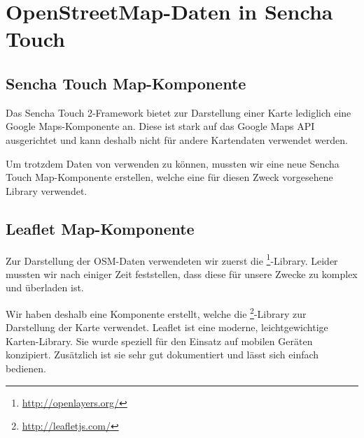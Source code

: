 \chapter{OpenStreetMap-Daten in Sencha Touch}
\label{leaflet-sencha-komponente}

\section{Sencha Touch Map-Komponente}

Das Sencha Touch 2-Framework bietet zur Darstellung einer Karte lediglich eine Google Maps-Komponente an.
Diese ist stark auf das Google Maps API ausgerichtet und kann deshalb nicht für andere Kartendaten verwendet werden.

Um trotzdem Daten von  verwenden zu können, mussten wir eine neue Sencha Touch Map-Komponente erstellen, welche eine für diesen Zweck vorgesehene Library verwendet.

\section{Leaflet Map-Komponente}

Zur Darstellung der OSM-Daten verwendeten wir zuerst die \footnote{\url{http://openlayers.org/}}-Library.
Leider mussten wir nach einiger Zeit feststellen, dass diese für unsere Zwecke zu komplex und überladen ist.

Wir haben deshalb eine Komponente erstellt, welche die \footnote{\url{http://leafletjs.com/}}-Library zur Darstellung der Karte verwendet.
Leaflet ist eine moderne, leichtgewichtige Karten-Library.
Sie wurde speziell für den Einsatz auf mobilen Geräten konzipiert.
Zusätzlich ist sie sehr gut dokumentiert und lässt sich einfach bedienen.

